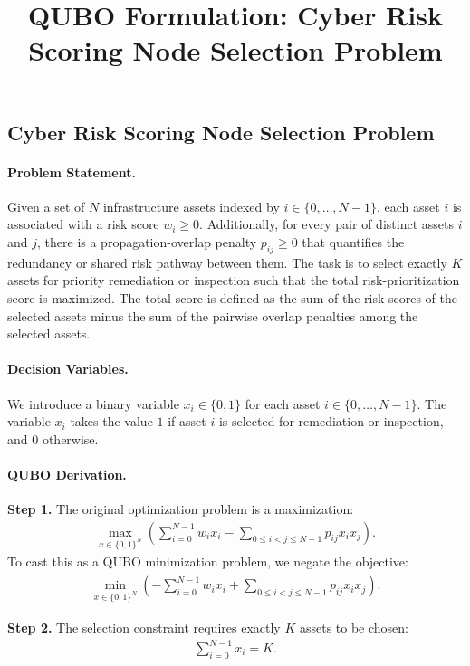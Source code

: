 \documentclass[12pt]{article}
\title{QUBO Formulation: Cyber Risk Scoring Node Selection Problem}
\date{}
\begin{document}
\maketitle

\subsection*{Cyber Risk Scoring Node Selection Problem}

\paragraph{Problem Statement.}
Given a set of $N$ infrastructure assets indexed by $i \in \{0, \dots, N-1\}$, each asset $i$ is associated with a risk score $w_i \ge 0$. Additionally, for every pair of distinct assets $i$ and $j$, there is a propagation-overlap penalty $p_{ij} \ge 0$ that quantifies the redundancy or shared risk pathway between them. The task is to select exactly $K$ assets for priority remediation or inspection such that the total risk-prioritization score is maximized. The total score is defined as the sum of the risk scores of the selected assets minus the sum of the pairwise overlap penalties among the selected assets.

\paragraph{Decision Variables.}
We introduce a binary variable $x_i \in \{0,1\}$ for each asset $i \in \{0, \dots, N-1\}$. The variable $x_i$ takes the value $1$ if asset $i$ is selected for remediation or inspection, and $0$ otherwise.

\paragraph{QUBO Derivation.}
\textbf{Step 1.} The original optimization problem is a maximization:
\begin{align}
  \max_{x \in \{0,1\}^N} \left( \sum_{i=0}^{N-1} w_i x_i - \sum_{0 \le i < j \le N-1} p_{ij} x_i x_j \right).
\end{align}
To cast this as a QUBO minimization problem, we negate the objective:
\begin{align}
  \min_{x \in \{0,1\}^N} \left( -\sum_{i=0}^{N-1} w_i x_i + \sum_{0 \le i < j \le N-1} p_{ij} x_i x_j \right).
\end{align}

\textbf{Step 2.} The selection constraint requires exactly $K$ assets to be chosen:
\begin{align}
  \sum_{i=0}^{N-1} x_i = K.
\end{align}
\end{document}
